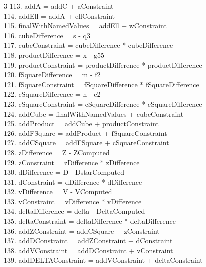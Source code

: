 \documentclass[10pt]{article}
\begin{document}
\begin{multicols}{3}
113. addA = addC + aConstraint\\
114. addEll = addA + ellConstraint\\
115. finalWithNamedValues = addEll + wConstraint\\
116. cubeDifference = s - q3\\
117. cubeConstraint = cubeDifference * cubeDifference\\
118. productDifference = x - g55\\
119. productConstraint = productDifference * productDifference\\
120. fSquareDifference = m - f2\\
121. fSquareConstraint = fSquareDifference * fSquareDifference\\
122. cSquareDifference = n - c2\\
123. cSquareConstraint = cSquareDifference * cSquareDifference\\
124. addCube = finalWithNamedValues + cubeConstraint\\
125. addProduct = addCube + productConstraint\\
126. addFSquare = addProduct + fSquareConstraint\\
127. addCSquare = addFSquare + cSquareConstraint\\
128. zDifference = Z - ZComputed\\
129. zConstraint = zDifference * zDifference\\
130. dDifference = D - DstarComputed\\
131. dConstraint = dDifference * dDifference\\
132. vDifference = V - VComputed\\
133. vConstraint = vDifference * vDifference\\
134. deltaDifference = delta - DeltaComputed\\
135. deltaConstraint = deltaDifference * deltaDifference\\
136. addZConstraint = addCSquare + zConstraint\\
137. addDConstraint = addZConstraint + dConstraint\\
138. addVConstraint = addDConstraint + vConstraint\\
139. addDELTAConstraint = addVConstraint + deltaConstraint\\
\end{multicols}
\end{document}

